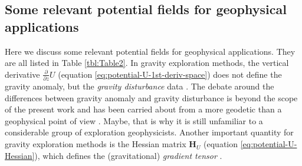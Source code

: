 \documentclass[manuscript,noblind]{geophysics}
\begin{document}
	\subsection{Some relevant potential fields for geophysical applications}
	\label{subsec:relevant-potential-fields}
	
	Here we discuss some relevant potential fields for geophysical applications. 
	They are all listed in Table \ref{tbl:Table2}. 
	In gravity exploration methods, the vertical derivative $\tfrac{\partial}{\partial z} U$
	(equation \ref{eq:potential-U-1st-deriv-space}) does not define the gravity anomaly, but the \textit{gravity disturbance} data 
	\cite[e.g.,][ p. 93]{hofmann-wellenhof-moritz2005}.
	The debate around the differences between gravity anomaly and gravity disturbance is beyond the scope of the 
	present work and has been carried about from a more geodetic than a geophysical point of view 
	\citep[e.g.,][]{li2001, fairhead2003, hackney-featherstone2003, hinze2005, vajda-etal2006, vajda-etal2007, vajda-etal2008}. 
	Maybe, that is why it is still unfamiliar to a considerable group of exploration geophysicists.
	Another important quantity for gravity exploration methods is the Hessian matrix $\mathbf{H}_{U}$
	(equation \ref{eq:potential-U-Hessian}), which defines the
	(gravitational) \textit{gradient tensor} \citep[e.g.,][]{pedersen_rasmussen1990}.
	
\end{document}
